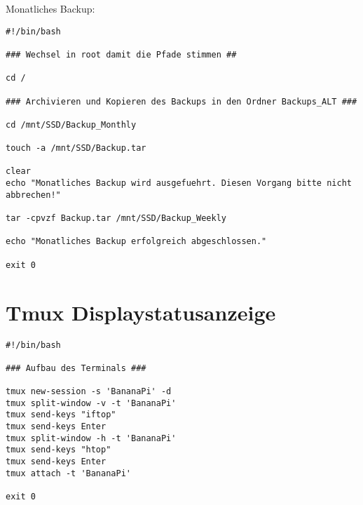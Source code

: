 \newpage
Monatliches Backup:
\begin{lstlisting}
#!/bin/bash

### Wechsel in root damit die Pfade stimmen ##

cd /

### Archivieren und Kopieren des Backups in den Ordner Backups_ALT ###

cd /mnt/SSD/Backup_Monthly

touch -a /mnt/SSD/Backup.tar

clear
echo "Monatliches Backup wird ausgefuehrt. Diesen Vorgang bitte nicht abbrechen!"

tar -cpvzf Backup.tar /mnt/SSD/Backup_Weekly

echo "Monatliches Backup erfolgreich abgeschlossen."

exit 0
\end{lstlisting}

\chapter{Tmux Displaystatusanzeige}

\begin{lstlisting}
#!/bin/bash

### Aufbau des Terminals ###

tmux new-session -s 'BananaPi' -d
tmux split-window -v -t 'BananaPi'
tmux send-keys "iftop" 
tmux send-keys Enter
tmux split-window -h -t 'BananaPi'
tmux send-keys "htop" 
tmux send-keys Enter
tmux attach -t 'BananaPi'

exit 0
\end{lstlisting}
